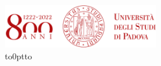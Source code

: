 %


\begin{titlepage}
	\centering	
	
	\includegraphics[width=0.5\textwidth]{resources/unipd-800} \\[2mm]
	\vbox to0pt{\vbox to\vss}
	

\end{titlepage}
